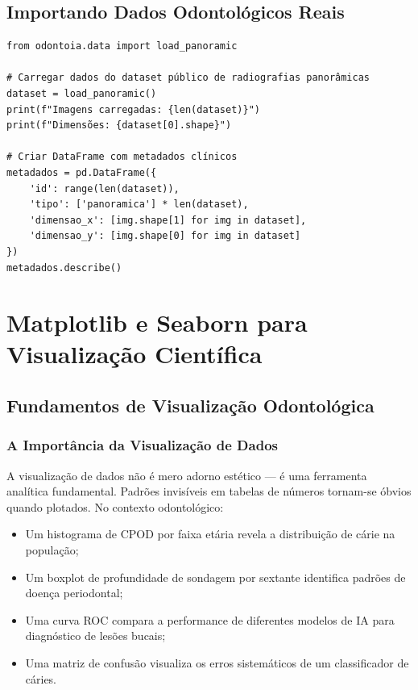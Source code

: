 \subsection{Importando Dados Odontológicos Reais}

\begin{verbatim}
from odontoia.data import load_panoramic

# Carregar dados do dataset público de radiografias panorâmicas
dataset = load_panoramic()
print(f"Imagens carregadas: {len(dataset)}")
print(f"Dimensões: {dataset[0].shape}")

# Criar DataFrame com metadados clínicos
metadados = pd.DataFrame({
    'id': range(len(dataset)),
    'tipo': ['panoramica'] * len(dataset),
    'dimensao_x': [img.shape[1] for img in dataset],
    'dimensao_y': [img.shape[0] for img in dataset]
})
metadados.describe()
\end{verbatim}

\section{Matplotlib e Seaborn para Visualização Científica}

\subsection{Fundamentos de Visualização Odontológica}

\subsubsection{A Importância da Visualização de Dados}

A visualização de dados não é mero adorno estético — é uma ferramenta analítica fundamental. Padrões invisíveis em tabelas de números tornam-se óbvios quando plotados. No contexto odontológico:

\begin{itemize}
    \item Um histograma de CPOD por faixa etária revela a distribuição de cárie na população;
    \item Um boxplot de profundidade de sondagem por sextante identifica padrões de doença periodontal;
    \item Uma curva ROC compara a performance de diferentes modelos de IA para diagnóstico de lesões bucais;
    \item Uma matriz de confusão visualiza os erros sistemáticos de um classificador de cáries.
\end{itemize}


